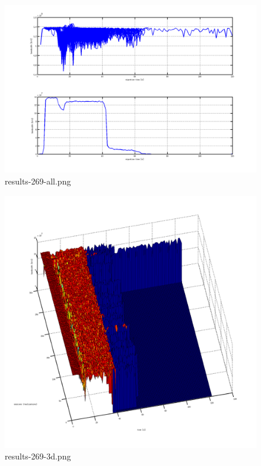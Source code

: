 \begin{figure}[htb]
	\begin{center}
	\includegraphics[width=\textwidth]{results-269-all.png}
	\end{center}
	\caption{results-269-all.png}
	\label{img:results-269-all.png}
\end{figure}
\begin{figure}[htb]
	\begin{center}
	\includegraphics[width=\textwidth]{results-269-3d.png}
	\end{center}
	\caption{results-269-3d.png}
	\label{img:results-269-3d.png}
\end{figure}
